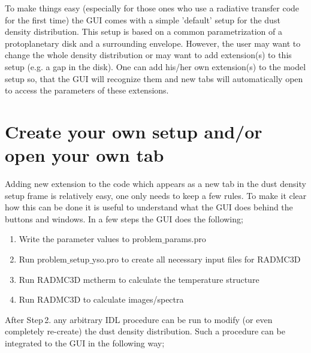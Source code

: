 \documentclass{report}
\begin{document}
To make things easy (especially for those ones who use a radiative transfer
code for the first time) the GUI comes with a simple 'default' setup for the
dust density distribution. This setup is based on a common parametrization
of a protoplanetary disk and a surrounding envelope. However, the user may
want to change the whole density distribution or may want to add
extension(s) to this setup (e.g. a gap in the disk). One can add his/her own
extension(s) to the model setup so, that the GUI will recognize them and new
tabs will automatically open to access the parameters of these extensions.


\section{Create your own setup and/or open your own tab}
Adding new extension to the code which appears as a new tab in the dust
density setup frame is relatively easy, one only needs to keep a few
rules. To make it clear how this can be done it is useful to understand what
the GUI does behind the buttons and windows. In a few steps the GUI does the
following;

\begin{enumerate}
\item Write the parameter values to problem$\_$params.pro
\item Run problem$\_$setup$\_$yso.pro to create all necessary input files for RADMC3D
\item Run RADMC3D mctherm to calculate the temperature structure
\item Run RADMC3D to calculate images/spectra
\end{enumerate}

After Step\,2. any arbitrary IDL procedure can be run to modify (or even
completely re-create) the dust density distribution. Such a procedure can be
integrated to the GUI in the following way;
\end{document}
